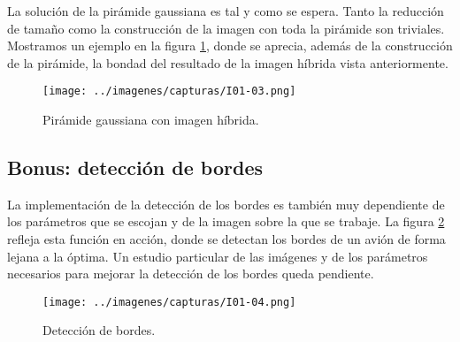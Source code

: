 \documentclass[a4paper, 11pt]{article}
\theoremstyle{definition}
\theoremstyle{theorem}
\begin{document}
  La solución de la pirámide gaussiana es tal y como se espera. Tanto la reducción de tamaño como la construcción de la imagen con toda la pirámide son triviales. Mostramos un ejemplo en la figura \ref{piramide}, donde se aprecia, además de la construcción de la pirámide, la bondad del resultado de la imagen híbrida vista anteriormente.

  \begin{figure}[ht!]
      \centering
      \texttt{[image: ../imagenes/capturas/I01-03.png]}
      \caption{Pirámide gaussiana con imagen híbrida. \label{piramide}}
  \end{figure}

  \subsection{Bonus: detección de bordes}
  La implementación de la detección de los bordes es también muy dependiente de los parámetros que se escojan y de la imagen sobre la que se trabaje. La figura \ref{bordes} refleja esta función en acción, donde se detectan los bordes de un avión de forma lejana a la óptima. Un estudio particular de las imágenes y de los parámetros necesarios para mejorar la detección de los bordes queda pendiente.

  \begin{figure}[ht!]
      \centering
      \texttt{[image: ../imagenes/capturas/I01-04.png]}
      \caption{Detección de bordes. \label{bordes}}
  \end{figure}
\end{document}
